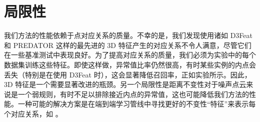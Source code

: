 \chapter{局限性}
我们方法的性能依赖于点对应关系的质量。不幸的是，我们发现使用诸如 D3Feat 和 PREDATOR 这样的最先进的 3D 特征产生的对应关系不令人满意，尽管它们在一些基准测试中表现良好。为了提高对应关系的质量，我们必须为实验中的每个数据集训练这些特征。即使这样做，异常值比率仍然很高，有时某些实例的内点会丢失（特别是在使用 D3Feat 时），这会显著降低召回率，正如实验所示。因此，3D 特征是一个需要显著改进的瓶颈。另一个局限性是距离不变性对于噪声点云来说是一个弱规则，有时不足以排除接近内点的异常值，这也可能降低我们方法的性能。一种可能的解决方案是在端到端学习管线中寻找更好的不变性“特征”来表示每个对应关系，如 \cite{PointDSC}。